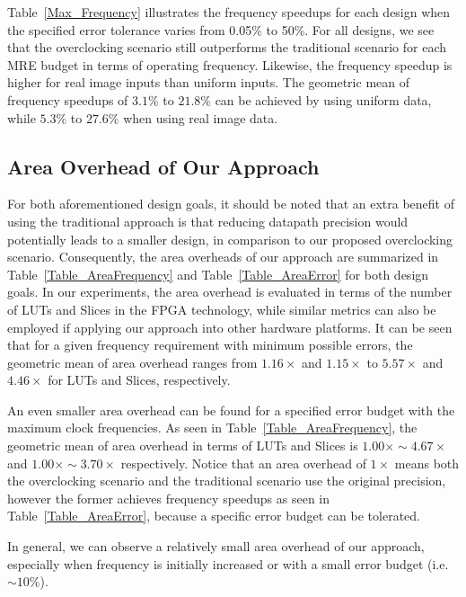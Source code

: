 \documentclass[journal]{IEEEtran}
\begin{document}
Table~\ref{Max_Frequency} illustrates the frequency speedups for each design when the specified error tolerance varies from 0.05\% to 50\%. For all designs, we see that the overclocking scenario still outperforms the traditional scenario for each MRE budget in terms of operating frequency. Likewise, the frequency speedup is higher for real image inputs than uniform inputs. The geometric mean of frequency speedups of $3.1\%$ to $21.8\%$ can be achieved by using uniform data, while $5.3\%$ to $27.6\%$ when using real image data.

\subsection{Area Overhead of Our Approach}
For both aforementioned design goals, it should be noted that an extra benefit of using the traditional approach is that reducing datapath precision would potentially leads to a smaller design, in comparison to our proposed overclocking scenario. Consequently, the area overheads of our approach are summarized in Table~\ref{Table_AreaFrequency} and Table~\ref{Table_AreaError} for both design goals. In our experiments, the area overhead is evaluated in terms of the number of LUTs and Slices in the FPGA technology, while similar metrics can also be employed if applying our approach into other hardware platforms. It can be seen that for a given frequency requirement with minimum possible errors, the geometric mean of area overhead ranges from $1.16\times$ and $1.15\times$ to $5.57\times$ and $4.46\times$ for LUTs and Slices, respectively.

An even smaller area overhead can be found for a specified error budget with the maximum clock frequencies. As seen in Table~\ref{Table_AreaFrequency}, the geometric mean of area overhead in terms of LUTs and Slices is $1.00\times\sim4.67\times$ and $1.00\times\sim3.70\times$ respectively. Notice that an area overhead of $1\times$ means both the overclocking scenario and the traditional scenario use the original precision, however the former achieves frequency speedups as seen in Table~\ref{Table_AreaError}, because a specific error budget can be tolerated.

In general, we can observe a relatively small area overhead of our approach, especially when frequency is initially increased or with a small error budget (i.e. $\sim10\%$).
\end{document}
